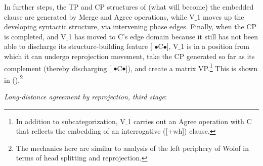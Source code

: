 \documentclass[output=paper
,modfonts
,nonflat]{langsci/langscibook}
\begin{document}
In further steps, the TP and CP structures of (what will become) the
embedded clause are generated by Merge and Agree operations, while V$\_$1 moves up
   the developing syntactic structure, via intervening phase
   edges. Finally, when the CP is completed, and V$\_$1 has moved to C's
   edge domain because it still has not been able to discharge its
   structure-building feature [{\small
    $\bullet$}C{\small $\bullet$}], V$\_$1 is in a position from which it
  can undergo reprojection movement, take the CP generated so far as
  its complement (thereby discharging [{\small
    $\bullet$}C{\small $\bullet$}]), and create a matrix
  VP.\footnote{In addition to subcategorization, V$\_$1 carries out an
    Agree operation with C that reflects the embedding of an
    interrogative ([+wh]) clause.} This is
  shown in (\Next).\footnote{The mechanics here are similar to 
    analysis of the left periphery of Wolof
   in terms of head splitting and reprojection.}   

\ea\label{ex:mueller:34} {\itshape Long-distance agreement \label{Baum3}by reprojection, third stage}:
\z
\end{document}
